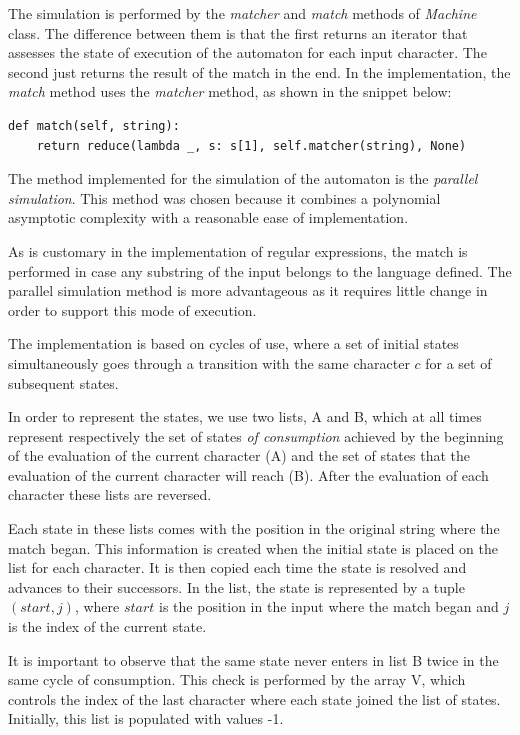 \documentclass{llncs}
\begin{document}
The simulation is performed by the \emph{matcher} and \emph{match} methods of \emph {Machine} class. The difference between them is that the first returns an iterator that assesses the state of execution of the automaton for each input character. The second just returns the result of the match in the end. In the implementation, the  \emph {match} method uses the  \emph {matcher} method, as shown in the snippet below: 

\begin{verbatim}
def match(self, string):
    return reduce(lambda _, s: s[1], self.matcher(string), None)
\end{verbatim}

The method implemented for the simulation of the automaton is the \emph {parallel simulation}. This method was chosen because it combines a polynomial asymptotic complexity with a reasonable ease of implementation. 

As is customary in the implementation of regular expressions, the match is performed in case any substring of the input belongs to the language defined. The parallel simulation method is more advantageous as it requires little change in order to support this mode of execution.

The implementation is based on cycles of use, where a set of initial states simultaneously goes through a transition with the same character $c$ for a set of subsequent states.

In order to represent the states, we use two lists, A and B, which at all times represent respectively the set of states \emph {of consumption}  achieved by the beginning of the evaluation of the current character (A) and the set of states that the evaluation of the current character will reach (B). After the evaluation of each character these lists are reversed.

Each state in these lists comes with the position in the original string where the match began. This information is created when the initial state is placed on the list for each character. It is then copied each time the state is resolved and advances to their successors. In the list, the state is represented by a tuple $ (start, j) $, where $ start$ is the position in the input where the match began and $ j $ is the index of the current state.

It is important to observe that the same state never enters in list B twice in the same cycle of consumption. This check is performed by the array V, which controls the index of the last character where each state joined the list of states. Initially, this list is populated with values  -1. 
\end{document}
